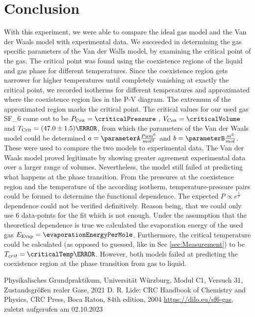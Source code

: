 \documentclass[a4paper,10pt,twocolumn]{article}
\begin{document}
    \section[]{Conclusion}\label{sec:conclusion}
    With this experiment, we were able to compare the ideal gas model and the Van der Waals model with experimental data.
    We succeeded in determining the gas specific parameters of the Van der Walls model, by examining the critical point of the gas.
    The critical point was found using the coexistence regions of the liquid and gas phase for different temperatures. 
    Since the coexistence region gets narrower for higher temperatures until completely vanishing at exactly the critical point, we recorded isotherms for different temperatures
    and approximated where the coexistence region lies in the P-V diagram.
    The extremum of the approximated region marks the critical point.
    The critical values for our used gas SF_6\) came out to be $P_{\text{Crit}}=\criticalPressure$ , $V_{\text{Crit}}=\criticalVolume$ and $T_{\text{Crit}}=(47.0\pm 1.5)\degree$, from which the parameters of the Van der Waals model could be determined
    $a=\parameterA \frac{Pa m^6}{mol^2} $ and $b=\parameterB \frac{m^3}{mol} $.
    These were used to compare the two models to experimental data.
    The Van der Waals model proved legitimate by showing greater agreement experimental data over a larger range of volumes.
    Nevertheless, the model still failed at predicting what happens at the phase transition.
    From the pressures at the coexistence region and the temperature of the according isotherm, temperature-pressure pairs could be formed to determine the functional dependence.
    The expected $P \propto e^{\frac{1}{T}} $ dependence could not be verified definitively.
    Reason being, that we could only use 6 data-points for the fit which is not enough.
    Under the assumption that the theoretical dependence is true we calculated the evaporation energy of the used gas $E_{\text{Evap}} =\evaporationEnergyPerMole $.
    Furthermore, the critical temperature could be calculated (as opposed to guessed, like in Sec \ref{sec:Measurement}) to be $T_{crit}=\criticalTemp \degree$.
    However, both models failed at predicting the coexistence region at the phase transition from gas to liquid.

    \begin{thebibliography}{}    %
         Physikalisches Grundpraktikum, Universität Würzburg, Modul C1, Versuch 31, Zustandsgrößen realer Gase, 2021
         D. R. Lide: \grqq CRC Handbook of Chemistry
        and Physics\grqq , CRC Press, Boca Raton, 84th
        edition, 2004
         \url{https://dilo.eu/sf6-gas}, zuletzt aufgerufen am 02.10.2023
    \end{thebibliography}
    \clearpage
\end{document}

